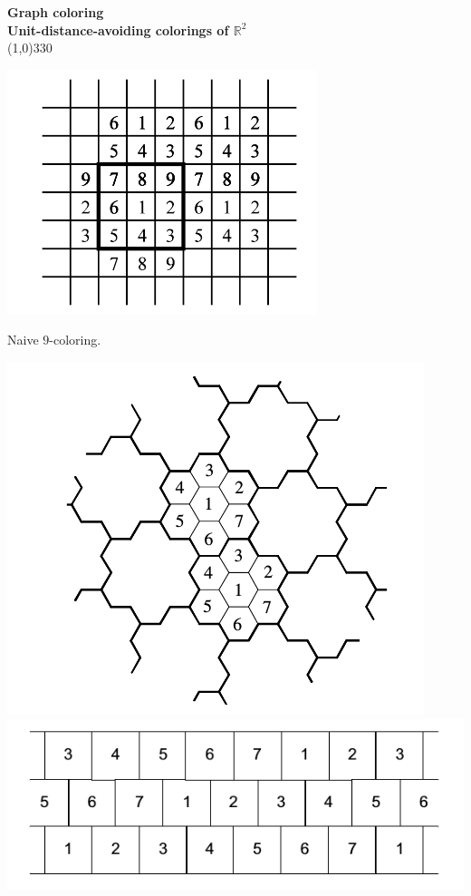 \documentclass[a4paper]{article}
\newcommand{\RR}{\mathbb{R}}
\begin{document}
\pagestyle{empty}
\begin{center}
	{\Large\bf Graph coloring}\\
	{\large\bf Unit-distance-avoiding colorings of $\RR^2$}\\
	\line(1,0){330}
\end{center}

\includegraphics[scale=0.4]{mf8.png}

Naive $9$-coloring.

\bigskip

\includegraphics[scale=0.5]{mf5.png}  \includegraphics[scale=0.5]{mf9.png}
\end{document}
